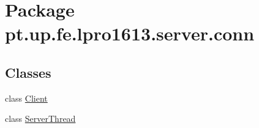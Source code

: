 \hypertarget{namespacept_1_1up_1_1fe_1_1lpro1613_1_1server_1_1conn}{}\section{Package pt.\+up.\+fe.\+lpro1613.\+server.\+conn}
\label{namespacept_1_1up_1_1fe_1_1lpro1613_1_1server_1_1conn}
\subsection*{Classes}
\begin{DoxyCompactItemize}
\item 
class \hyperlink{classpt_1_1up_1_1fe_1_1lpro1613_1_1server_1_1conn_1_1_client}{Client}
\item 
class \hyperlink{classpt_1_1up_1_1fe_1_1lpro1613_1_1server_1_1conn_1_1_server_thread}{Server\+Thread}
\end{DoxyCompactItemize}
